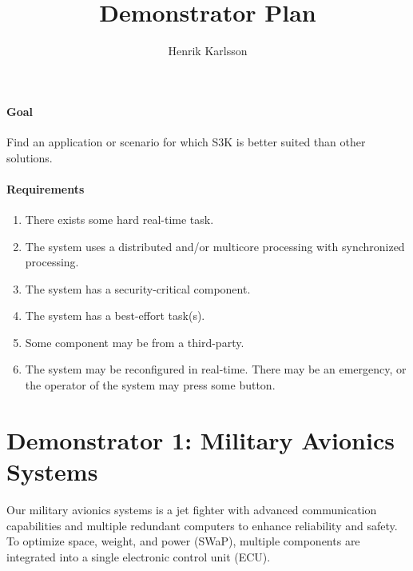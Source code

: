 \documentclass[a4paper,11pt]{article}
\title{Demonstrator Plan}
\author{Henrik Karlsson}
\begin{document}
	\maketitle

	\paragraph{Goal} Find an application or scenario for which S3K is better suited than other solutions.

	\paragraph{Requirements}
	\begin{enumerate}[label=R\arabic*)]
		\item There exists some hard real-time task.
		\item The system uses a distributed and/or multicore processing with synchronized processing.
		\item The system has a security-critical component.
		\item The system has a best-effort task(s).
		\item Some component may be from a third-party.
		\item The system may be reconfigured in real-time. There may be an emergency, or the operator of the system may press some button.
	\end{enumerate}

	\newpage
	\section*{Demonstrator 1: Military Avionics Systems}
	Our military avionics systems is a jet fighter with advanced communication capabilities and multiple redundant computers to enhance reliability and safety. 
	To optimize space, weight, and power (SWaP), multiple components are integrated into a single electronic control unit (ECU).
\end{document}
